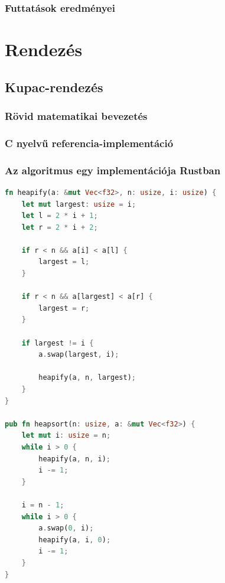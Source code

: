 \subsubsection{Futtatások eredményei} %

\section{Rendezés}

\subsection{Kupac-rendezés}
\subsubsection{Rövid matematikai bevezetés}
\subsubsection{C nyelvű referencia-implementáció}
\subsubsection{Az algoritmus egy implementációja Rustban}
\begin{lstlisting}[language=Rust]
fn heapify(a: &mut Vec<f32>, n: usize, i: usize) {
	let mut largest: usize = i;
	let l = 2 * i + 1;
	let r = 2 * i + 2;
	
	if r < n && a[i] < a[l] {
		largest = l;
	}
	
	if r < n && a[largest] < a[r] {
		largest = r;
	}
	
	if largest != i {
		a.swap(largest, i);
		
		heapify(a, n, largest);
	}
}

pub fn heapsort(n: usize, a: &mut Vec<f32>) {
	let mut i: usize = n;
	while i > 0 {
		heapify(a, n, i);
		i -= 1;
	}

	i = n - 1;
	while i > 0 {
		a.swap(0, i);
		heapify(a, i, 0);
		i -= 1;
	}
}
\end{lstlisting}

